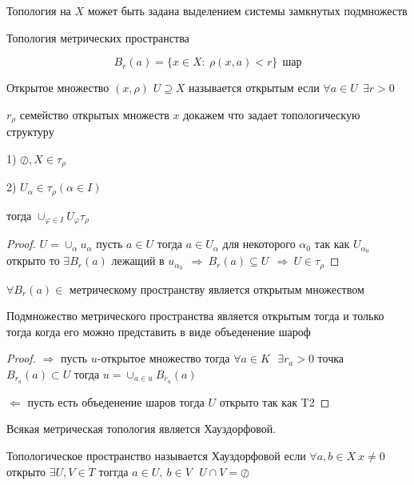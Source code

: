 \begin{block}[Замечание]
  Топология на $X$ может быть задана выделением системы замкнутых подмножеств
\end{block}

\begin{title}[\Large]
  Топология метрических пространства
\end{title}

$$
B_r(a) = \{x \in X : ~ \rho(x,a) < r\} ~~ \text{шар}
$$

Открытое множество $(x,\rho)$ $U \supseteq X$ называется открытым если
$\forall a \in U ~~ \exists r > 0$

$r_{\rho}$ семейство открытых множеств $x$ докажем что задает топологическую
структуру

1) $\oslash, X \in \tau_{\rho}$

2) $U_{\alpha} \in \tau_{\rho} (\alpha \in I)$

тогда $\cup_{\varphi \in I} U_{\varphi} \tau_{\rho}$

\begin{proof}
  $U = \cup_{\alpha} u_{\alpha}$ пусть $a \in U$ тогда $a \in U_{\alpha}$ для
  некоторого $\alpha_0$ так как $U_{\alpha_0}$ открыто то $\exists B_r(a)$
  лежащий в $u_{\alpha_0} ~~ \Rightarrow ~ B_r (a) \subseteq U ~~ \Rightarrow ~
  U \in \tau_{\rho}$
\end{proof}

\begin{theorem}
  $\forall B_r(a) \in$ метрическому пространству является открытым множеством
\end{theorem}

\begin{theorem}
  Подмножество метрического пространства является открытым тогда и только
  тогда когда его можно представить в виде объеденение шароф
\end{theorem}

\begin{proof}
  $\Rightarrow$ пусть $u$-открытое множество тогда $\forall a \in K ~~~
  \exists r_a > 0$ точка $B_{r_a}(a) \subset U$ тогда $u = \cup_{a \in u}
  B_{r_a}(a)$

  $\Leftarrow$ пусть есть объеденение шаров тогда $U$ открыто так как T2
\end{proof}

\begin{theorem}
  Всякая метрическая топология является Хауздорфовой.

  Топологическое пространство называется Хауздорфовой если $\forall a,b \in X ~
  x \not= 0$ открыто $\exists U, V \in T$ тоггда $a \in U, ~ b \in V ~~~
  U \cap V = \oslash$
\end{theorem}


